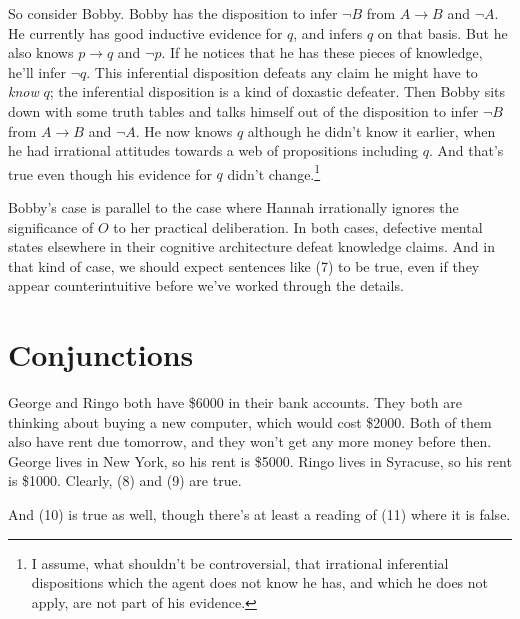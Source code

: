 So consider Bobby. Bobby has the disposition to infer $\neg B$ from $A \rightarrow B$ and $\neg A$. He currently has good inductive evidence for $q$, and infers $q$ on that basis. But he also knows $p \rightarrow q$ and $\neg p$. If he notices that he has these pieces of knowledge, he'll infer $\neg q$. This inferential disposition defeats any claim he might have to \textit{know} $q$; the inferential disposition is a kind of doxastic defeater. Then Bobby sits down with some truth tables and talks himself out of the disposition to infer $\neg B$ from $A \rightarrow B$ and $\neg A$. He now knows $q$ although he didn't know it earlier, when he had irrational attitudes towards a web of propositions including $q$. And that's true even though his evidence for $q$ didn't change.\footnote{I assume, what shouldn't be controversial, that irrational inferential dispositions which the agent does not know he has, and which he does not apply, are not part of his evidence.} 

Bobby's case is parallel to the case where Hannah irrationally ignores the significance of $O$ to her practical deliberation. In both cases, defective mental states elsewhere in their cognitive architecture defeat knowledge claims. And in that kind of case, we should expect sentences like (7) to be true, even if they appear counterintuitive before we've worked through the details.

\section{Conjunctions}
\noindent George and Ringo both have \$6000 in their bank accounts. They both are thinking about buying a new computer, which would cost \$2000. Both of them also have rent due tomorrow, and they won't get any more money before then. George lives in New York, so his rent is \$5000. Ringo lives in Syracuse, so his rent is \$1000. Clearly, (8) and (9) are true.


\noindent And (10) is true as well, though there's at least a reading of (11) where it is false.


